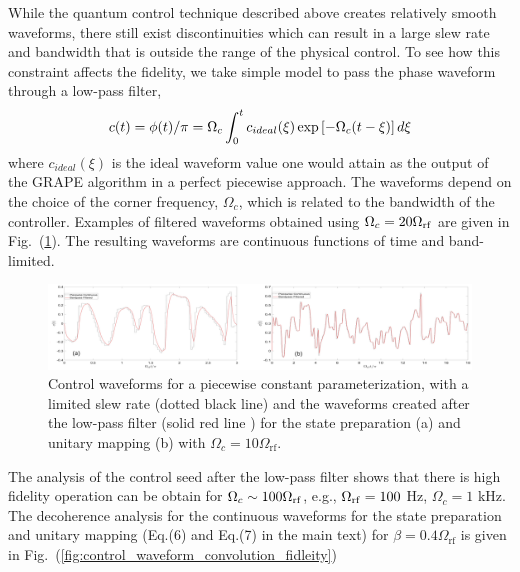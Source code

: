 \documentclass[aps,prl,onecolumn,reprint,superscriptaddress]{revtex4}
\begin{document}
While the quantum control technique described above creates relatively smooth waveforms, there still exist discontinuities which can result in a large slew rate and bandwidth that is outside the range of the physical control. To see how this constraint affects the fidelity, we take simple model to pass the phase waveform through a low-pass filter,
\begin{equation}
     c(t)=\phi(t)/\pi=\Omega_c\int_{0}^{t} c_{ideal}(\xi)\exp\left[-\Omega_c(t-\xi)\right]d\xi\\
    \label{eq:LIS}
\end{equation}
where $c_{ideal}(\xi)$ is the ideal waveform value one would attain as the output of the GRAPE algorithm in a perfect piecewise approach. The waveforms depend on the choice of the corner frequency, $\Omega_c$, which is related to the bandwidth of the controller.  Examples of filtered waveforms obtained using $\Omega_c = 20 \Omega_{\rm{rf}} $ are given in Fig.~(\ref{fig:control_waveform_convolution}).  The resulting waveforms are continuous functions of time and band-limited. 

\begin{figure}
\includegraphics[width=1\textwidth]{band_ramps122.eps}
\caption{Control waveforms for a piecewise constant parameterization, with a limited slew rate (dotted black line) and the waveforms created after the low-pass filter (solid red line ) for the state preparation (a) and unitary mapping (b) with $\Omega_c=10\Omega_{\mathrm{rf}}$.  }
\label{fig:control_waveform_convolution}
\end{figure}

The analysis of the control seed after the low-pass filter shows that there is high fidelity operation can be obtain for $\Omega_c \sim 100 \Omega_{\rm{rf}}$, e.g., $\Omega_{\rm{rf}} = 100$ Hz, $\Omega_{c} = 1$ kHz. The decoherence analysis for the continuous waveforms for the state preparation and  unitary mapping (Eq.(6) and Eq.(7) in the main text)  for $\beta=0.4\Omega_{\mathrm{rf}}$ is given in Fig.~(\ref{fig:control_waveform_convolution_fidleity})
\end{document}
